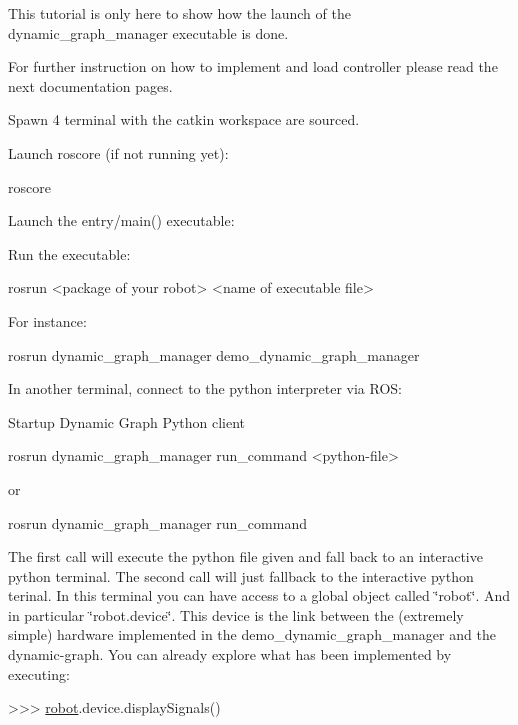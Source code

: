 This tutorial is only here to show how the launch of the dynamic\+\_\+graph\+\_\+manager executable is done.

For further instruction on how to implement and load controller please read the next documentation pages.

Spawn 4 terminal with the catkin workspace are sourced.
\begin{DoxyEnumerate}
\item Launch roscore (if not running yet)\+: 
\begin{DoxyCode}
roscore
\end{DoxyCode}

\item Launch the entry/main() executable\+:
\begin{DoxyEnumerate}
\item Run the executable\+: 
\begin{DoxyCode}
rosrun <package of your robot> <name of executable file>
\end{DoxyCode}
 For instance\+: 
\begin{DoxyCode}
rosrun dynamic\_graph\_manager demo\_dynamic\_graph\_manager
\end{DoxyCode}

\end{DoxyEnumerate}
\item In another terminal, connect to the python interpreter via R\+OS\+:
\begin{DoxyEnumerate}
\item Startup Dynamic Graph Python client 
\begin{DoxyCode}
rosrun dynamic\_graph\_manager run\_command <python-file>
\end{DoxyCode}
 or 
\begin{DoxyCode}
rosrun dynamic\_graph\_manager run\_command
\end{DoxyCode}
 The first call will execute the python file given and fall back to an interactive python terminal. The second call will just fallback to the interactive python terinal. In this terminal you can have access to a global object called \char`\"{}robot\char`\"{}. And in particular \char`\"{}robot.\+device\char`\"{}. This device is the link between the (extremely simple) hardware implemented in the demo\+\_\+dynamic\+\_\+graph\+\_\+manager and the dynamic-\/graph. You can already explore what has been implemented by executing\+: 
\begin{DoxyCode}
>>> \hyperlink{namespacerobot}{robot}.device.displaySignals()
\end{DoxyCode}


\end{DoxyEnumerate}
\end{DoxyEnumerate}
